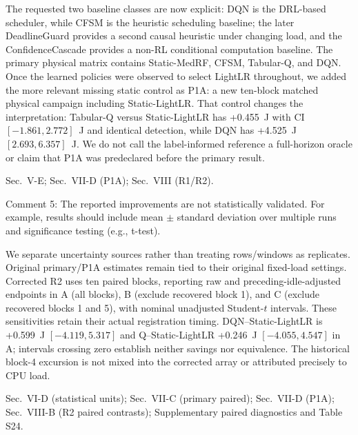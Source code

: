 \documentclass[10pt,a4paper]{article}
\begin{document}
\begin{authorresponsebox}
The requested two baseline classes are now explicit: DQN is the DRL-based scheduler, while CFSM is the heuristic scheduling baseline; the later DeadlineGuard provides a second causal heuristic under changing load, and the ConfidenceCascade provides a non-RL conditional computation baseline. The primary physical matrix contains Static-MedRF, CFSM, Tabular-Q, and DQN. Once the learned policies were observed to select LightLR throughout, we added the more relevant missing static control as P1A: a new ten-block matched physical campaign including Static-LightLR. That control changes the interpretation: Tabular-Q versus Static-LightLR has +0.455~J with CI $[-1.861, 2.772]$~J and identical detection, while DQN has +4.525~J $[2.693, 6.357]$~J. We do not call the label-informed reference a full-horizon oracle or claim that P1A was predeclared before the primary result.
\end{authorresponsebox}

\begin{wherebox}
Sec.~V-E; Sec.~VII-D (P1A); Sec.~VIII (R1/R2).
\end{wherebox}

\begin{rcommentbox}
Comment 5: The reported improvements are not statistically validated. For example, results should include mean $\pm$ standard deviation over multiple runs and significance testing (e.g., t-test).
\end{rcommentbox}

\begin{authorresponsebox}
We separate uncertainty sources rather than treating rows/windows as replicates. Original primary/P1A estimates remain tied to their original fixed-load settings. Corrected R2 uses ten paired blocks, reporting raw and preceding-idle-adjusted endpoints in A (all blocks), B (exclude recovered block 1), and C (exclude recovered blocks 1 and 5), with nominal unadjusted Student-$t$ intervals. These sensitivities retain their actual registration timing. DQN--Static-LightLR is +0.599~J $[-4.119,5.317]$ and Q--Static-LightLR +0.246~J $[-4.055,4.547]$ in A; intervals crossing zero establish neither savings nor equivalence. The historical block-4 excursion is not mixed into the corrected array or attributed precisely to CPU load.
\end{authorresponsebox}

\begin{wherebox}
Sec.~VI-D (statistical units); Sec.~VII-C (primary paired); Sec.~VII-D (P1A); Sec.~VIII-B (R2 paired contrasts); Supplementary paired diagnostics and Table S24.
\end{wherebox}
\end{document}
